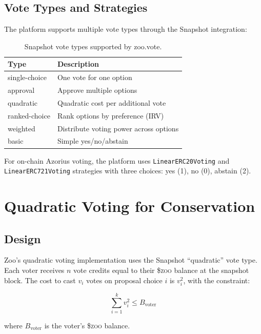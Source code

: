 \documentclass[11pt,letterpaper]{article}
\newcommand{\ZOO}{\$\textsc{zoo}}
\begin{document}
\subsection{Vote Types and Strategies}

The platform supports multiple vote types through the Snapshot integration:

\begin{table}[t]
\centering
\begin{tabular}{lp{6cm}}
\toprule
\textbf{Type} & \textbf{Description} \\
\midrule
single-choice & One vote for one option \\
approval & Approve multiple options \\
quadratic & Quadratic cost per additional vote \\
ranked-choice & Rank options by preference (IRV) \\
weighted & Distribute voting power across options \\
basic & Simple yes/no/abstain \\
\bottomrule
\end{tabular}
\caption{Snapshot vote types supported by zoo.vote.}
\label{tab:votetypes}
\end{table}

For on-chain Azorius voting, the platform uses \texttt{LinearERC20Voting} and \texttt{LinearERC721Voting} strategies with three choices: yes (1), no (0), abstain (2).

\section{Quadratic Voting for Conservation}
\label{sec:quadratic}

\subsection{Design}

Zoo's quadratic voting implementation uses the Snapshot ``quadratic'' vote type. Each voter receives $n$ vote credits equal to their \ZOO{} balance at the snapshot block. The cost to cast $v_i$ votes on proposal choice $i$ is $v_i^2$, with the constraint:

\begin{equation}
\sum_{i=1}^{k} v_i^2 \leq B_{\text{voter}}
\end{equation}

where $B_{\text{voter}}$ is the voter's \ZOO{} balance.
\end{document}
